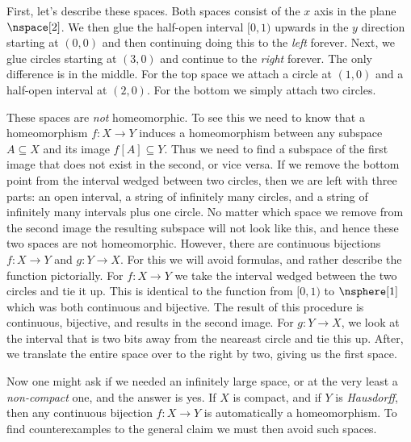 \documentclass[oneside]{book}                                                  %
\begin{document}
                First, let's describe these spaces. Both spaces consist of the
                $x$ axis in the plane $\nspace[2]$. We then glue the half-open
                interval $[0,1)$ upwards in the $y$ direction starting at
                $(0,0)$ and then continuing doing this to the \textit{left}
                forever. Next, we glue circles starting at $(3,0)$ and continue
                to the \textit{right} forever. The only difference is in the
                middle. For the top space we attach a circle at $(1,0)$ and a
                half-open interval at $(2,0)$. For the bottom we simply attach
                two circles.
                \par\hfill\par
                These spaces are \textit{not} homeomorphic. To see this we need
                to know that a homeomorphism $f:X\rightarrow{Y}$ induces a
                homeomorphism between any subspace $A\subseteq{X}$ and its image
                $f[A]\subseteq{Y}$. Thus we need to find a subspace of the first
                image that does not exist in the second, or vice versa. If we
                remove the bottom point from the interval wedged between two
                circles, then we are left with three parts: an open interval,
                a string of infinitely many circles, and a string of infinitely
                many intervals plus one circle. No matter which space we remove
                from the second image the resulting subspace will not look like
                this, and hence these two spaces are not homeomorphic. However,
                there are continuous bijections $f:X\rightarrow{Y}$ and
                $g:Y\rightarrow{X}$. For this we will avoid formulas, and rather
                describe the function pictorially. For $f:X\rightarrow{Y}$ we
                take the interval wedged between the two circles and tie it up.
                This is identical to the function from $[0,1)$ to $\nsphere[1]$
                which was both continuous and bijective. The result of this
                procedure is continuous, bijective, and results in the second
                image. For $g:Y\rightarrow{X}$, we look at the interval that is
                two bits away from the neareast circle and tie this up. After,
                we translate the entire space over to the right by two, giving
                us the first space.
                \par\hfill\par
                Now one might ask if we needed an infinitely large space, or at
                the very least a \textit{non-compact} one, and the answer is
                yes. If $X$ is compact, and if $Y$ is \textit{Hausdorff}, then
                any continuous bijection $f:X\rightarrow{Y}$ is automatically a
                homeomorphism. To find counterexamples to the general claim we
                must then avoid such spaces.
\end{document}
